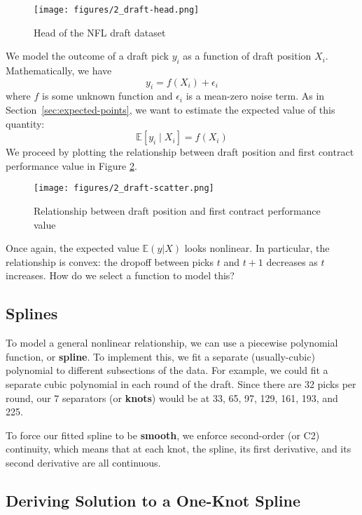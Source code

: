 \documentclass[twoside]{article}
\theoremstyle{definition}
\begin{document}
\begin{figure}[H]
    \centering
    \texttt{[image: figures/2\_draft-head.png]}
    \caption{Head of the NFL draft dataset}
    \label{fig:draft-head}
\end{figure}
We model the outcome of a draft pick $y_i$ as a function of draft position $X_i$. Mathematically, we have
\begin{equation}
    y_i = f(X_i) + \epsilon_i
\end{equation}
where $f$ is some unknown function and $\epsilon_i$ is a mean-zero noise term. As in Section~\ref{sec:expected-points}, we want to estimate the expected value of this quantity:
\begin{equation}
    \mathbb{E}[y_i \mid X_i] = f(X_i)
\end{equation}
We proceed by plotting the relationship between draft position and first contract performance value in Figure \ref{fig:draft-scatter}.
\begin{figure}[H]
    \centering
    \texttt{[image: figures/2\_draft-scatter.png]}
    \caption{Relationship between draft position and first contract performance value}
    \label{fig:draft-scatter}
\end{figure}
Once again, the expected value $\mathbb{E}(y|X)$ looks nonlinear. In particular, the relationship is convex: the dropoff between picks $t$ and $t+1$ decreases as $t$ increases. How do we select a function to model this?

\subsection{Splines}

To model a general nonlinear relationship, we can use a piecewise polynomial function, or \textbf{spline}. To implement this, we fit a separate (usually-cubic) polynomial to different subsections of the data. For example, we could fit a separate cubic polynomial in each round of the draft. Since there are 32 picks per round, our $7$ separators (or \textbf{knots}) would be at 33, 65, 97, 129, 161, 193, and 225.

To force our fitted spline to be \textbf{smooth}, we enforce second-order (or C2) continuity, which means that at each knot, the spline, its first derivative, and its second derivative are all continuous.

\subsection{Deriving Solution to a One-Knot Spline}
\end{document}
